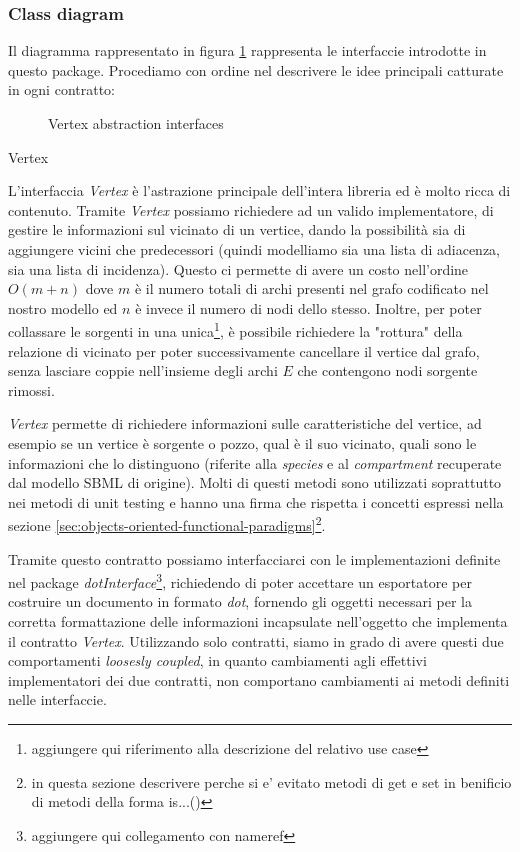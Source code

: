 \subsubsection*{Class diagram}
Il diagramma rappresentato in figura
\ref{fig:vertex-abstraction-interfaces} rappresenta le interfaccie
introdotte in questo package. Procediamo con ordine nel descrivere le
idee principali catturate in ogni contratto:

\begin{figure}
  \centering
  \caption{Vertex abstraction interfaces}
  \label{fig:vertex-abstraction-interfaces}
\end{figure}

\begin{paragraph}{Vertex}

  L'interfaccia \emph{Vertex} \`e l'astrazione principale dell'intera
  libreria ed \`e molto ricca di contenuto.  Tramite \emph{Vertex}
  possiamo richiedere ad un valido implementatore, di gestire le
  informazioni sul vicinato di un vertice, dando la possibilit\`a sia
  di aggiungere vicini che predecessori (quindi modelliamo sia una
  lista di adiacenza, sia una lista di incidenza). Questo ci permette
  di avere un costo nell'ordine $O(m + n)$ dove $m$ \`e il numero
  totali di archi presenti nel grafo codificato nel nostro modello ed
  $n$ \`e invece il numero di nodi dello stesso. Inoltre, per poter
  collassare le sorgenti in una unica\footnote{aggiungere qui
    riferimento alla descrizione del relativo use case}, \`e possibile
  richiedere la "rottura" della relazione di vicinato per poter
  successivamente cancellare il vertice dal grafo, senza lasciare
  coppie nell'insieme degli archi $E$ che contengono nodi sorgente
  rimossi.

  \emph{Vertex} permette di richiedere informazioni sulle
  caratteristiche del vertice, ad esempio se un vertice \`e sorgente o
  pozzo, qual \`e il suo vicinato, quali sono le informazioni che lo
  distinguono (riferite alla \emph{species} e al \emph{compartment}
  recuperate dal modello SBML di origine). Molti di questi metodi sono
  utilizzati soprattutto nei metodi di unit testing e hanno una firma
  che rispetta i concetti espressi nella sezione
  \ref{sec:objects-oriented-functional-paradigms}\footnote{in questa
    sezione descrivere perche si e' evitato metodi di get e set in
    benificio di metodi della forma is...()}.

  Tramite questo contratto possiamo interfacciarci con le
  implementazioni definite nel package
  \emph{dotInterface}\footnote{aggiungere qui collegamento con
    nameref}, richiedendo di poter accettare un esportatore per
  costruire un documento in formato \emph{dot}, fornendo gli oggetti
  necessari per la corretta formattazione delle informazioni
  incapsulate nell'oggetto che implementa il contratto
  \emph{Vertex}. Utilizzando solo contratti, siamo in grado di avere
  questi due comportamenti \emph{loosesly coupled}, in quanto
  cambiamenti agli effettivi implementatori dei due contratti, non
  comportano cambiamenti ai metodi definiti nelle interfaccie.


\end{paragraph}
